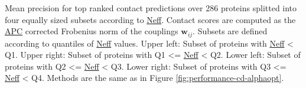 \documentclass[12pt,a4paper,twoside]{book}
\newcommand{\wij}{\mathbf{w}_{ij}}
\theoremstyle{definition}
\theoremstyle{definition}
\theoremstyle{remark}
\begin{document}
Mean precision for top ranked contact predictions over 286 proteins
splitted into four equally sized subsets according to
\protect\hyperlink{abbrev}{Neff}. Contact scores are computed as the
\protect\hyperlink{abbrev}{APC} corrected Frobenius norm of the
couplings \(\wij\). Subsets are defined according to quantiles of
\protect\hyperlink{abbrev}{Neff} values. Upper left: Subset of proteins
with \protect\hyperlink{abbrev}{Neff} \textless{} Q1. Upper right:
Subset of proteins with Q1 \textless{}= \protect\hyperlink{abbrev}{Neff}
\textless{} Q2. Lower left: Subset of proteins with Q2 \textless{}=
\protect\hyperlink{abbrev}{Neff} \textless{} Q3. Lower right: Subset of
proteins with Q3 \textless{}= \protect\hyperlink{abbrev}{Neff}
\textless{} Q4. Methods are the same as in Figure
\ref{fig:performance-cd-alphaopt}.
\end{document}
